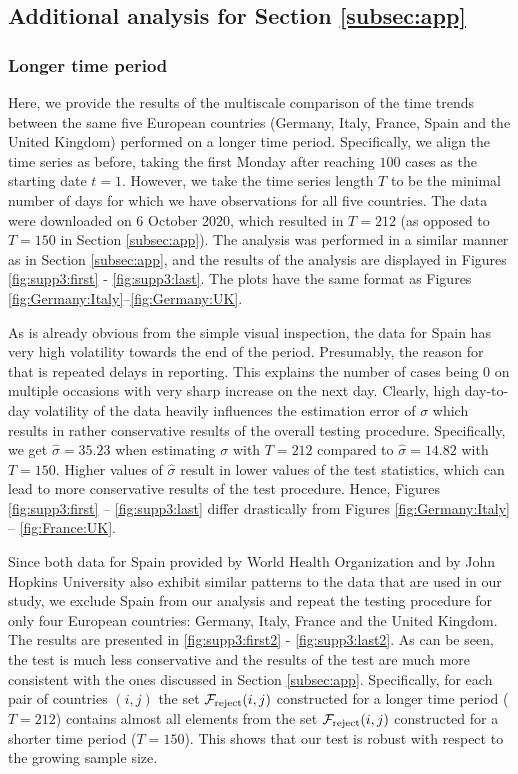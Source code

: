 \documentclass[a4paper,12pt]{article}
\numberwithin{equation}{section}
\begin{document}
\clearpage
\subsection{Additional analysis for Section \ref{subsec:app}}
\subsubsection{Longer time period}\label{s:subsec:app:3}


Here, we provide the results of the multiscale comparison of the time trends between the same five European countries (Germany, Italy, France, Spain and the United Kingdom) performed on a longer time period. Specifically, we align the time series as before, taking the first Monday after reaching $100$ cases as the starting date $t = 1$. However, we take the time series length $T$ to be the minimal number of days for which we have observations for all five countries. The data were downloaded on 6 October 2020, which resulted in $T = 212$ (as opposed to $T = 150$ in Section \ref{subsec:app}). The analysis was performed in a similar manner as in Section \ref{subsec:app}, and the results of the analysis are displayed in Figures \ref{fig:supp3:first} - \ref{fig:supp3:last}. The plots have the same format as Figures \ref{fig:Germany:Italy}--\ref{fig:Germany:UK}.

As is already obvious from the simple visual inspection, the data for Spain has very high volatility towards the end of the period. Presumably, the reason for that is repeated delays in reporting. This explains the number of cases being $0$ on multiple occasions with very sharp increase on the next day. Clearly, high day-to-day volatility of the data heavily influences the estimation error of $\sigma$ which results in rather conservative results of the overall testing procedure. Specifically, we get $\widehat{\sigma} = 35.23$ when estimating $\sigma$ with $T=212$ compared to $\widehat{\sigma} = 14.82$ with $T = 150$. Higher values of $\widehat{\sigma}$ result in lower values of the test statistics, which can lead to more conservative results of the test procedure. Hence, Figures \ref{fig:supp3:first} -- \ref{fig:supp3:last} differ drastically from Figures \ref{fig:Germany:Italy} -- \ref{fig:France:UK}. 


Since both data for Spain provided by World Health Organization and by John Hopkins University also exhibit similar patterns to the data that are used in our study, we exclude Spain from our analysis and repeat the testing procedure for only four European countries: Germany, Italy, France and the United Kingdom. The results are presented in \ref{fig:supp3:first2} - \ref{fig:supp3:last2}. As can be seen, the test is much less conservative and the results of the test are much more consistent with the ones discussed in Section \ref{subsec:app}. Specifically, for each pair of countries $(i, j)$ the set $\mathcal{F}_{\text{reject}}(i, j)$ constructed for a longer time period ($T = 212$) contains almost all elements from the set $\mathcal{F}_{\text{reject}}(i, j)$ constructed for a shorter time period ($T = 150$). This shows that our test is robust with respect to the growing sample size.
\end{document}
